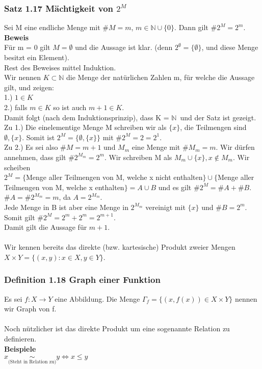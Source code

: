 \documentclass{scrartcl}
\newcommand{\N}{\mathbb{N}}
\newcommand{\mN}{\(\mathbb{N}\)}
\begin{document}
\subsubsection{Satz 1.17 M\"achtigkeit von \(2^M\)}
Sei M eine endliche Menge mit \(\#M = m\), \(m \in \N \cup \{0\}\). Dann gilt \(\#2^M = 2^m\).\\
\textbf{Beweis}\\
F\"ur m = 0 gilt \(M = \emptyset\) und die Aussage ist klar. (denn \(2^\emptyset = \{\emptyset\}\), und diese Menge besitzt ein Element).\\
Rest des Beweises mittel Induktion.\\
Wir nennen \(K \subset \N\) die Menge der nat\"urlichen Zahlen m, f\"ur welche die Aussage gilt, und zeigen:\\
1.) \(1 \in K\)\\
2.) falls \(m \in K\) so ist auch \(m + 1 \in K\).\\
Damit folgt (nach dem Induktionsprinzip), dass  K = \mN\ und der Satz ist gezeigt.\\
Zu 1.) Die einelementige Menge M schreiben wir als \(\{x\}\), die Teilmengen sind \(\emptyset, \{x\}\). Somit ist \(2^M = \{\emptyset, \{x\}\}\) mit \(\#2^M = 2 = 2^1\).\\
Zu 2.) Es sei also \(\#M = m + 1\)  und \(M_m\) eine Menge mit \(\# M_m = m\). Wir d\"urfen annehmen, dass gilt \(\#2^{M_m} = 2^m\). Wir schreiben M als \(M_m \cup \{x\}, x \not\in M_m\). Wir scheiben\\
\(2^M = \{\)Menge aller Teilmengen von M, welche x nicht enthalten\(\} \cup \{\)Menge aller Teilmengen von M, welche x enthalten\(\} = A \cup B\) und es gilt \(\#2^M = \#A + \#B\).\\
\(\#A = \#2^{M_m} = m\), da \(A = 2^{M_m}\).\\
Jede Menge in B ist aber eine Menge in \(2^{M_m}\) vereinigt mit \(\{x\}\) und \(\#B = 2^m\). Somit gilt \(\#2^M = 2^m + 2^m = 2^{m + 1}\).\\
Damit gilt die Aussage f\"ur \(m + 1\).\\
\\
Wir kennen bereits das direkte (bzw. kartesische) Produkt zweier Mengen \(X \times Y = \{(x, y) : x\in X, y \in Y\}\).\\

\subsubsection{Definition 1.18 Graph einer Funktion}
Es sei \(f : X \to Y\) eine Abbildung. Die Menge \(\Gamma_f = \{(x, f(x)) \in X \times Y\}\) nennen wir Graph von f.\\
\\
Noch n\"utzlicher ist das direkte Produkt um eine sogenannte Relation zu definieren.\\
\textbf{Beispiele}\\
\(x \underset{\text{(Steht in Relation zu)}}{\sim} y \Leftrightarrow x \le y\)\\
\end{document}
